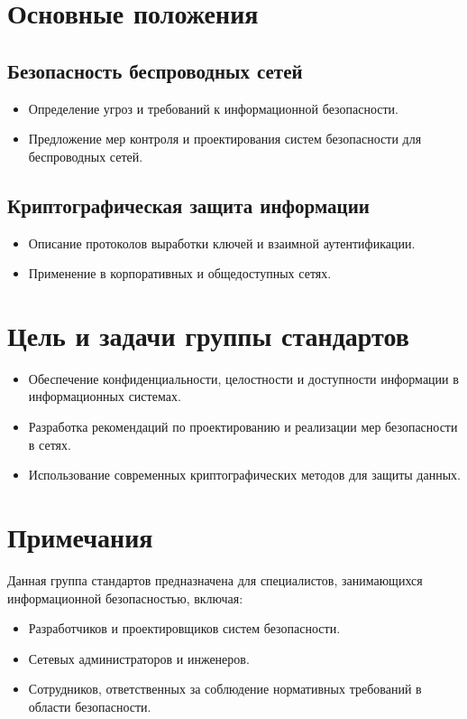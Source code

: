 \section*{Основные положения}
\subsection*{Безопасность беспроводных сетей}
\begin{itemize}
    \item Определение угроз и требований к информационной безопасности.
    \item Предложение мер контроля и проектирования систем безопасности для беспроводных сетей.
\end{itemize}

\subsection*{Криптографическая защита информации}
\begin{itemize}
    \item Описание протоколов выработки ключей и взаимной аутентификации.
    \item Применение в корпоративных и общедоступных сетях.
\end{itemize}

\section*{Цель и задачи группы стандартов}
\begin{itemize}
    \item Обеспечение конфиденциальности, целостности и доступности информации в информационных системах.
    \item Разработка рекомендаций по проектированию и реализации мер безопасности в сетях.
    \item Использование современных криптографических методов для защиты данных.
\end{itemize}

\section*{Примечания}
Данная группа стандартов предназначена для специалистов, занимающихся информационной безопасностью, включая:
\begin{itemize}
    \item Разработчиков и проектировщиков систем безопасности.
    \item Сетевых администраторов и инженеров.
    \item Сотрудников, ответственных за соблюдение нормативных требований в области безопасности.
\end{itemize}


